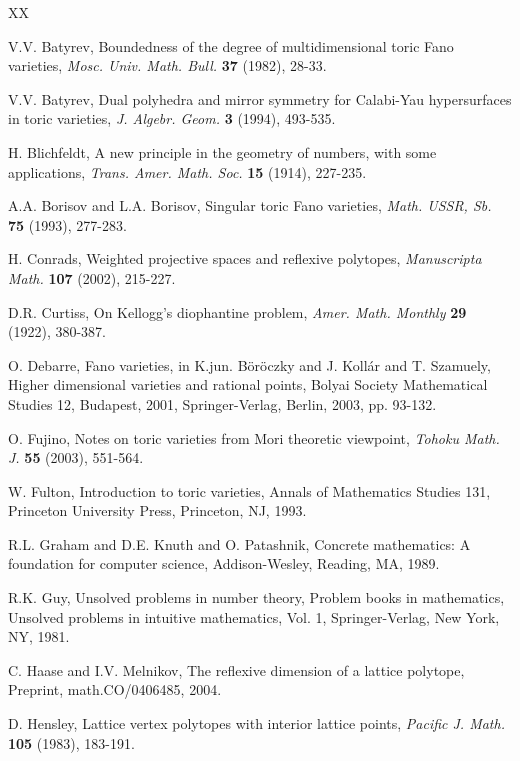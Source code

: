 \documentclass[a4paper,twoside]{article}
\begin{document}
\begin{thebibliography}{XX}                            

 V.V. Batyrev, Boundedness of the degree of multidimensional toric Fano varieties, \textit{Mosc. Univ. Math. Bull.} \textbf{37} (1982), 28-33.

 V.V. Batyrev, 
Dual polyhedra and mirror symmetry for Calabi-Yau hypersurfaces in 
toric varieties,  \textit{J. Algebr. Geom.} \textbf{3} (1994), 493-535.

 H. Blichfeldt, A new principle in the geometry of numbers, with some applications, \textit{Trans. Amer. Math. Soc.} \textbf{15} (1914), 227-235.

 A.A. Borisov and L.A. Borisov, Singular toric Fano varieties, \textit{Math. USSR, Sb.} \textbf{75} (1993), 277-283. 

 H. Conrads,  Weighted projective spaces and reflexive polytopes,  
\textit{Manuscripta Math.} \textbf{107} (2002), 215-227.

 D.R. Curtiss, On Kellogg's diophantine problem,  \textit{Amer. Math. Monthly} \textbf{29} (1922), 
380-387.

 O. Debarre, Fano varieties, in K.jun. B\"or\"oczky and J. Koll\'ar and T. Szamuely, 
Higher dimensional varieties and rational points, Bolyai Society Mathematical Studies 12, Budapest, 2001, 
Springer-Verlag, Berlin, 2003, pp. 93-132.

 O. Fujino, Notes on toric varieties from Mori theoretic viewpoint,  
\textit{Tohoku Math. J.} \textbf{55} (2003), 551-564.

 W. Fulton,  
Introduction to toric varieties, Annals of Mathematics Studies 131, Princeton University Press, Princeton, NJ, 1993.

 R.L. Graham and D.E. Knuth and O. Patashnik, 
Concrete mathematics: A foundation for computer science, Addison-Wesley, Reading, MA, 1989.

 R.K. Guy, Unsolved problems in number theory, Problem books in mathematics, Unsolved problems in intuitive mathematics, Vol. 1, 
Springer-Verlag, New York, NY, 1981.

 C. Haase and I.V. Melnikov, 
The reflexive dimension of a lattice polytope, Preprint, math.CO/0406485, 2004.

 D. Hensley, Lattice vertex polytopes with interior lattice points,  
\textit{Pacific J. Math.} \textbf{105} (1983), 183-191.


\end{thebibliography}
\end{document}
